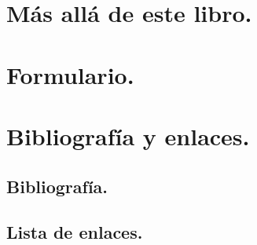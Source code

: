 \documentclass[10pt,a4paper]{book}
\begin{document}
\chapter{Más allá de este libro.}
\label{apendice:MasAlla}



\chapter{Formulario.}
\label{apendice:Tablas}
\newpage


%

\chapter{Bibliografía y enlaces.}\label{apendice:comentarioBibliografia}


%

\section{Bibliografía.}\label{bibliografia}


\section{Lista de enlaces.}


\backmatter

\printindex

\pagebreak
\thispagestyle{empty}
\mbox{}

\newpage
\thispagestyle{empty}
\mbox{  }
\end{document}
